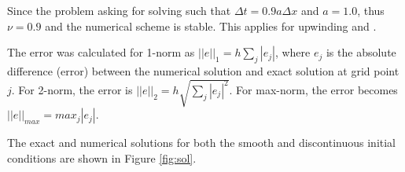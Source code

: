 Since the problem asking for solving such that $\Delta t =0.9a\Delta x$ and $a=1.0$, thus $\nu=0.9$ and the numerical scheme is stable. This applies for upwinding and \protect{\lw}. 

The error was calculated for 1-norm as $||e||_{1} = h\sum_{j}|e_{j}|$, where $e_{j}$ is the absolute difference (error) between the numerical solution and exact solution at grid point $j$. For 2-norm, the error is $||e||_{2} = h \sqrt{\sum_{j}|e_{j}|^2}$. For max-norm, the error becomes $||e||_{max}=max_{j}|e_{j}|$. 

The exact and numerical solutions for both the smooth and discontinuous initial conditions are shown in Figure \ref{fig:sol}.

\begin{figure}[!tbh]
 \centering     
   

\end{figure}
